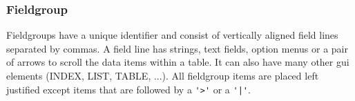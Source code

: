\subsubsection{Fieldgroup}
\label{sec:uifieldgroup}


Fieldgroups have a unique identifier and
consist of vertically aligned field lines separated by commas.
A field line has strings, text fields, option menus
or a pair of arrows to scroll the data items within a table.
It can also have many other gui elements (INDEX, LIST, TABLE, ...).
All fieldgroup items are placed left justified except items that are
followed by a \verb+'>'+ or a \verb+'|'+.




